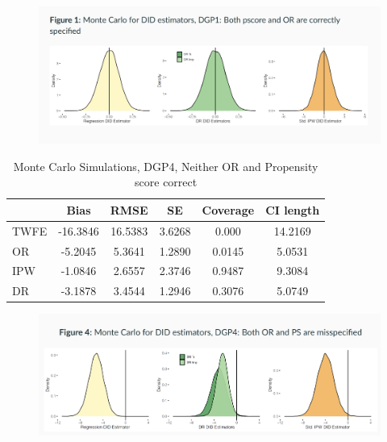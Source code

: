 \documentclass{beamer}
\begin{document}
\begin{frame}[plain]
	\begin{figure}
	\includegraphics[scale=0.25]{./lecture_includes/mc_dr_1.png}
	\end{figure}

\end{frame}


\begin{frame}[plain]

\begin{table}[htbp]\centering
\scriptsize
\caption{Monte Carlo Simulations, DGP4, Neither OR and Propensity score correct}
\centering
\begin{threeparttable}
\begin{tabular}{l*{5}{c}}
\toprule
\multicolumn{1}{l}{\textbf{}}&
\multicolumn{1}{c}{\textbf{Bias}}&
\multicolumn{1}{c}{\textbf{RMSE}}&
\multicolumn{1}{c}{\textbf{SE}}&
\multicolumn{1}{c}{\textbf{Coverage}}&
\multicolumn{1}{c}{\textbf{CI length}}\\
\midrule
TWFE & -16.3846 & 16.5383 & 3.6268 & 0.000 & 14.2169 \\
OR & -5.2045 & 5.3641 & 1.2890 & 0.0145 & 5.0531 \\
IPW & -1.0846 & 2.6557 & 2.3746 & 0.9487 & 9.3084 \\
DR & -3.1878 & 3.4544 & 1.2946 & 0.3076 & 5.0749 \\
\bottomrule
\end{tabular}
\end{threeparttable}
\end{table}

\end{frame}

\begin{frame}[plain]
	\begin{figure}
	\includegraphics[scale=0.12]{./lecture_includes/mc_dr_2.png}
	\end{figure}


\end{frame}
\end{document}
